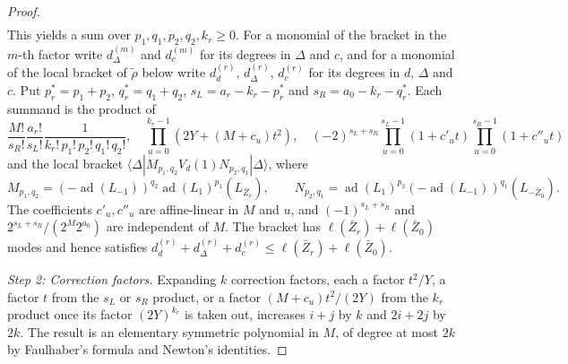 \documentclass[twoside,10pt]{article}
\numberwithin{equation}{section}
\theoremstyle{slbody}
\theoremstyle{definition}
\theoremstyle{remark}
\begin{document}
\begin{proof}
\begin{align*}
\end{align*}
This yields a sum over \(p_1,q_1,p_2,q_2,k_r\geq0\).  For a monomial of
the bracket in the \(m\)-th factor write \(d_\Delta^{(m)}\) and \(d_c^{(m)}\)
for its degrees in \(\Delta\) and \(c\), and for a monomial of the local
bracket of \(\widetilde\rho\) below write \(d_d^{(r)}\), \(d_\Delta^{(r)}\),
\(d_c^{(r)}\) for its degrees in \(d\), \(\Delta\) and \(c\).  Put
\(p_r^*=p_1+p_2\), \(q_r^*=q_1+q_2\), \(s_L=a_r-k_r-p_r^*\) and
\(s_R=a_0-k_r-q_r^*\).  Each summand is the product of
\[
 \frac{M!}{s_R!}\frac{a_r!}{s_L!}\frac{1}{k_r!\,p_1!\,p_2!\,q_1!\,q_2!},\quad
 \prod_{u=0}^{k_r-1}(2Y+(M+c_u)t^2),\quad
 (-2)^{s_L+s_R}\prod_{u=0}^{s_L-1}(1+c'_ut)\prod_{u=0}^{s_R-1}(1+c''_ut)
\]
and the local bracket
\(\langle\Delta|M_{p_1,q_2}V_d(1)N_{p_2,q_1}|\Delta\rangle\), where
\[
 M_{p_1,q_2}=(-\operatorname{ad}(L_{-1}))^{q_2}\operatorname{ad}(L_1)^{p_1}(L_{\bar Z_r}),\qquad
 N_{p_2,q_1}=\operatorname{ad}(L_1)^{p_2}(-\operatorname{ad}(L_{-1}))^{q_1}(L_{-\bar Z_0}).
\]
The coefficients \(c'_u,c''_u\) are affine-linear in \(M\) and \(u\), and
\((-1)^{s_L+s_R}\) and \(2^{s_L+s_R}/(2^M2^{a_0})\) are independent of \(M\).
The bracket has \(\ell(\bar Z_r)+\ell(\bar Z_0)\) modes and hence satisfies
\(d_d^{(r)}+d_\Delta^{(r)}+d_c^{(r)}\leq\ell(\bar Z_r)+\ell(\bar Z_0)\).

\emph{Step 2: Correction factors.}  Expanding \(k\) correction factors, each a factor \(t^2/Y\), a factor \(t\)
from the \(s_L\) or \(s_R\) product, or a factor \((M+c_u)t^2/(2Y)\) from the
\(k_r\) product once its factor \((2Y)^{k_r}\) is taken out, increases \(i+j\) by \(k\) and \(2i+2j\) by \(2k\).  The
result is an elementary symmetric polynomial in \(M\), of degree at most
\(2k\) by Faulhaber's formula and Newton's identities.


\end{proof}
\end{document}
